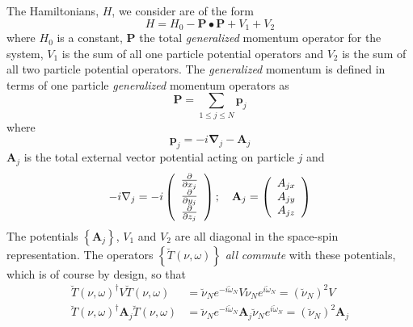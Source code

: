 \documentclass[aps,preprint]{revtex4}%
\begin{document}
The Hamiltonians, $H$, we consider are of the form%
\begin{equation}
H=H_{0}-\mathbf{P\bullet P}+V_{1}+V_{2}%
\end{equation}
where $H_{0}$ is a constant, $\mathbf{P}$ the total \emph{generalized
}momentum operator for the system, $V_{1}$ is the sum of all one particle
potential operators and $V_{2}$ is the sum of all two particle potential
operators. The \emph{generalized }momentum is defined in terms of one particle
\emph{generalized }momentum operators as
\begin{equation}
\mathbf{P=}%
{\displaystyle\sum\limits_{1\leq j\leq N}}
\mathbf{p}_{j}%
\end{equation}
where
\begin{equation}
\mathbf{p}_{j}=-i\mathbf{\nabla}_{j}-\mathbf{A}_{j}%
\end{equation}
$\mathbf{A}_{j}$ is the total external vector potential acting on particle $j$
and
\begin{equation}
-i\mathbf{\nabla}_{j}=-i\left(
\begin{array}
[c]{c}%
\frac{\partial}{\partial x_{j}}\\
\frac{\partial}{\partial y_{j}}\\
\frac{\partial}{\partial z_{j}}%
\end{array}
\right)  ;\quad\mathbf{A}_{j}=\left(
\begin{array}
[c]{c}%
A_{jx}\\
A_{jy}\\
A_{jz}%
\end{array}
\right)
\end{equation}
The potentials $\left\{  \mathbf{A}_{j}\right\}  $, $V_{1}$ and $V_{2}$ are
all diagonal in the space-spin representation. The operators $\left\{
\breve{T}\left(  \nu,\omega\right)  \right\}  $ \emph{all} \emph{commute }with
these potentials, which is of course by design, so that
\begin{align}
\breve{T}\left(  \nu,\omega\right)  ^{\dagger}V\breve{T}\left(  \nu
,\omega\right)   &  =\breve{\nu}_{N}e^{-i\breve{\omega}_{N}}V\breve{\nu}%
_{N}e^{i\breve{\omega}_{N}}=\left(  \breve{\nu}_{N}\right)  ^{2}V\nonumber\\
\breve{T}\left(  \nu,\omega\right)  ^{\dagger}\mathbf{A}_{j}\breve{T}\left(
\nu,\omega\right)   &  =\breve{\nu}_{N}e^{-i\breve{\omega}_{N}}\mathbf{A}%
_{j}\breve{\nu}_{N}e^{i\breve{\omega}_{N}}=\left(  \breve{\nu}_{N}\right)
^{2}\mathbf{A}_{j}%
\end{align}
\end{document}
